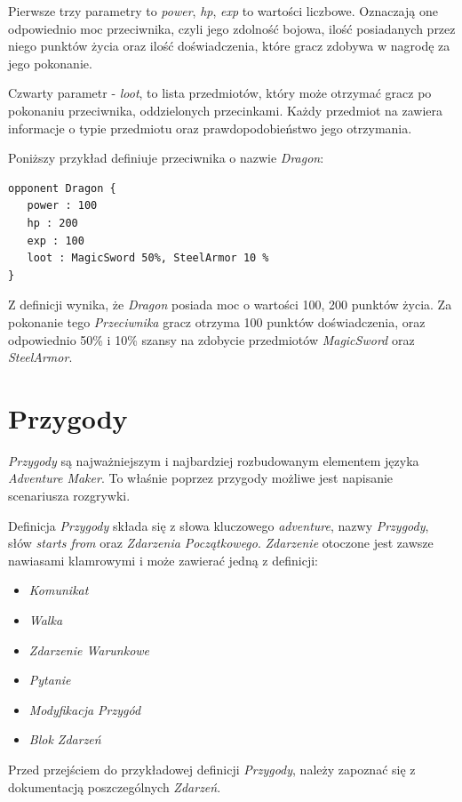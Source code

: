 \documentclass[openright]{xmgr}
\begin{document}
Pierwsze trzy parametry to \textit{power}, \textit{hp}, \textit{exp} to wartości liczbowe. Oznaczają one odpowiednio moc przeciwnika, czyli jego zdolność bojowa, ilość posiadanych przez niego punktów życia oraz ilość doświadczenia, które gracz zdobywa w nagrodę za jego pokonanie.

Czwarty parametr - \textit{loot}, to lista przedmiotów, który może otrzymać gracz po pokonaniu przeciwnika, oddzielonych przecinkami. Każdy przedmiot na zawiera informacje o typie przedmiotu oraz prawdopodobieństwo jego otrzymania.

Poniższy przykład definiuje przeciwnika o nazwie \textit{Dragon}:

\begin{verbatim}
opponent Dragon {
   power : 100
   hp : 200
   exp : 100
   loot : MagicSword 50%, SteelArmor 10 %
}
\end{verbatim}

Z definicji wynika, że \textit{Dragon} posiada moc o wartości 100, 200 punktów życia. Za pokonanie tego \textit{Przeciwnika} gracz otrzyma 100 punktów doświadczenia, oraz odpowiednio 50\% i 10\% szansy na zdobycie przedmiotów \textit{MagicSword} oraz \textit{SteelArmor}.

\section{Przygody}
\textit{Przygody} są najważniejszym i najbardziej rozbudowanym elementem języka \textit{Adventure Maker}. To właśnie poprzez przygody możliwe jest napisanie scenariusza rozgrywki. 

Definicja \textit{Przygody} składa się z słowa kluczowego \textit{adventure}, nazwy \textit{Przygody}, słów \textit{starts from} oraz \textit{Zdarzenia Początkowego}. \textit{Zdarzenie} otoczone jest zawsze nawiasami klamrowymi i może zawierać jedną z definicji:
\begin{itemize}
	\item \textit{Komunikat}
	\item \textit{Walka}
	\item \textit{Zdarzenie Warunkowe}
	\item \textit{Pytanie}
	\item \textit{Modyfikacja Przygód}
	\item \textit{Blok Zdarzeń}
\end{itemize}

Przed przejściem do przykładowej definicji \textit{Przygody}, należy zapoznać się z dokumentacją poszczególnych \textit{Zdarzeń}.
\end{document}
